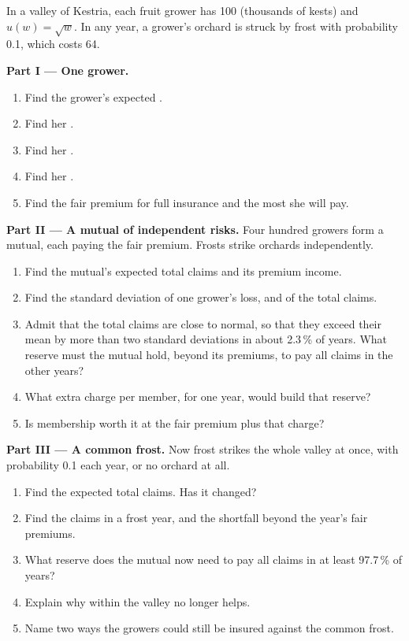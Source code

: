 \begin{problem}
\label{pb:g12:risk-and-insurance:1}
In a valley of Kestria, each fruit grower has  100 (thousands of kests) and $u(w) = \sqrt{w}$. In any year, a grower's orchard is struck by frost with probability
0.1, which costs 64.

\medskip
\noindent\textbf{Part I --- One grower.}
\begin{enumerate}
\item Find the grower's expected .
\item Find her .
\item Find her .
\item Find her .
\item Find the fair premium for full insurance and the most she will pay.
\end{enumerate}

\medskip
\noindent\textbf{Part II --- A mutual of independent risks.}
Four hundred growers form a mutual, each paying the fair premium. Frosts strike orchards independently.
\begin{enumerate}[resume]
\item Find the mutual's expected total claims and its premium income.
\item Find the standard deviation of one grower's loss, and of the total claims.
\item Admit that the total claims are close to normal, so that they exceed their mean by more than two standard deviations in about 2.3\,\% of years. What reserve must
  the mutual hold, beyond its premiums, to pay all claims in the other years?
\item What extra charge per member, for one year, would build that reserve?
\item Is membership worth it at the fair premium plus that charge?
\end{enumerate}

\medskip
\noindent\textbf{Part III --- A common frost.}
Now frost strikes the whole valley at once, with probability 0.1 each year, or no orchard at all.
\begin{enumerate}[resume]
\item Find the expected total claims. Has it changed?
\item Find the claims in a frost year, and the shortfall beyond the year's fair premiums.
\item What reserve does the mutual now need to pay all claims in at least 97.7\,\% of years?
\item Explain why  within the valley no longer helps.
\item Name two ways the growers could still be insured against the common frost.
\end{enumerate}


\end{problem}
